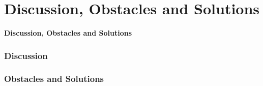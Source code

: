 \documentclass{beamer}
\begin{document}


\section{Discussion, Obstacles and Solutions}
\begin{frame}
\begin{center}
\textbf{Discussion, Obstacles and Solutions}
\end{center} 
\end{frame}
\begin{frame}
\frametitle{Discussion}


\end{frame}

\begin{frame}
\frametitle{Obstacles and Solutions}

\end{frame}
\end{document}
